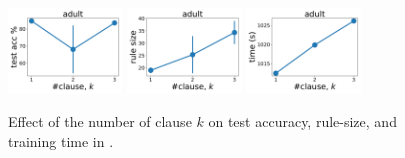 \begin{figure}
	\subfloat
	{\includegraphics[width=0.27\textwidth]{figures/interpretability/relaxed-cnf/adult_test_accuracy_vary_clause.pdf}}
	\subfloat
	{\includegraphics[width=0.27\textwidth]{figures/interpretability/relaxed-cnf/adult_rule_size_vary_clause.pdf}}
	\subfloat
	{\includegraphics[width=0.27\textwidth]{figures/interpretability/relaxed-cnf/adult_time_vary_clause.pdf}} 
	\\
	
	
	\caption[Effect of the number of clause $ k $ in {\crr}]{Effect of the number of clause $ k $ on test accuracy, rule-size, and training time in {\crr}. } 
	\label{interpretability_crr_fig:result_clause}
\end{figure}



